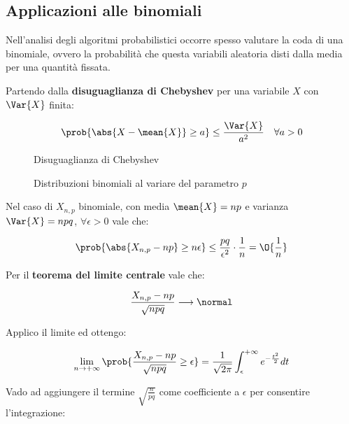 \documentclass[\main/main.tex]{subfiles}
\begin{document}
\subsection{Applicazioni alle binomiali}
Nell'analisi degli algoritmi probabilistici occorre spesso valutare la coda di una binomiale, ovvero la probabilità che questa variabili aleatoria disti dalla media per una quantità fissata.

Partendo dalla \textbf{disuguaglianza di Chebyshev} per una variabile \(X\) con \(\Var{X}\) finita:

\begin{figure}
  \[
    \prob{\abs{X-\mean{X}} \geq a} \leq \frac{\Var{X}}{a^2} \quad \forall a > 0
  \]
  \caption{Disuguaglianza di Chebyshev}
\end{figure}

\begin{figure}
  \caption{Distribuzioni binomiali al variare del parametro \(p\)}
\end{figure}

Nel caso di \(X_{n,p}\) binomiale, con media \(\mean{X} = np\) e varianza \(\Var{X} = npq\), \(\forall \epsilon > 0\) vale che:

\[
  \prob{\abs{X_{n,p} - np} \geq n\epsilon} \leq \frac{pq}{\epsilon^2}\cdot \frac{1}{n} = \O{\frac{1}{n}}
\]

Per il \textbf{teorema del limite centrale} vale che:

\[
  \frac{X_{n,p} - np}{\sqrt{npq}} \longrightarrow \normal
\]

Applico il limite ed ottengo:

\[
  \lim_{n\rightarrow+\infty} \prob{\frac{X_{n,p} - np}{\sqrt{npq}}\geq \epsilon} = \frac{1}{\sqrt{2\pi}} \int_{\epsilon}^{+\infty} e^{-\frac{t^2}{2}} dt
\]

Vado ad aggiungere il termine \(\sqrt{\frac{n}{pq}}\) come coefficiente a \(\epsilon \) per consentire l'integrazione:
\end{document}
